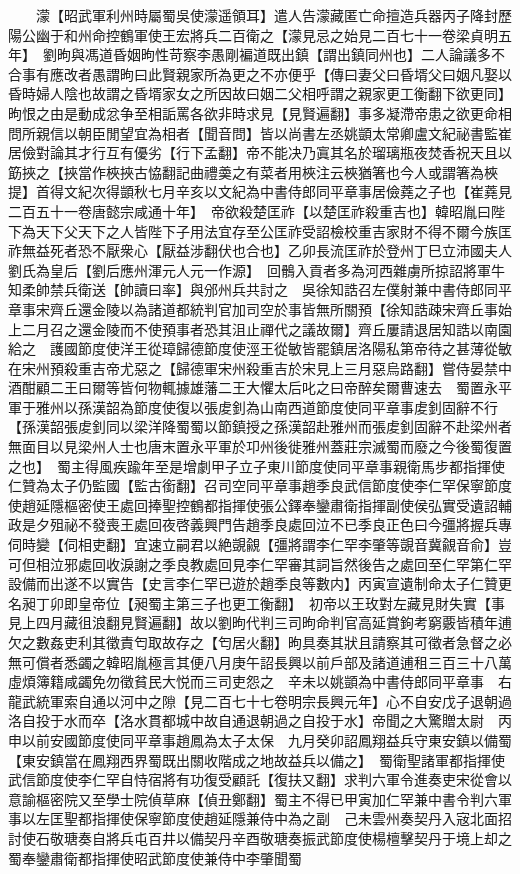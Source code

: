　　濛【昭武軍利州時屬蜀吳使濛遥領耳】遣人告濛藏匿亡命擅造兵器丙子降封歷陽公幽于和州命控鶴軍使王宏將兵二百衛之【濛見忌之始見二百七十一卷梁貞明五年】　劉昫與馮道昏姻昫性苛察李愚剛褊道既出鎮【謂出鎮同州也】二人論議多不合事有應改者愚謂昫曰此賢親家所為更之不亦便乎【傳曰妻父曰昏壻父曰姻凡娶以昏時婦人陰也故謂之昏壻家女之所因故曰姻二父相呼謂之親家更工衡翻下欲更同】昫恨之由是動成忿争至相詬罵各欲非時求見【見賢遍翻】事多凝滯帝患之欲更命相問所親信以朝臣閒望宜為相者【聞音問】皆以尚書左丞姚顗太常卿盧文紀祕書監崔居儉對論其才行互有優劣【行下孟翻】帝不能决乃寘其名於瑠璃瓶夜焚香祝天且以筯挾之【挾當作梜挾古恊翻記曲禮羮之有菜者用梜注云梜猶箸也今人或謂箸為梜提】首得文紀次得顗秋七月辛亥以文紀為中書侍郎同平章事居儉蕘之子也【崔蕘見二百五十一卷唐懿宗咸通十年】　帝欲殺楚匡祚【以楚匡祚殺重吉也】韓昭胤曰陛下為天下父天下之人皆陛下子用法宜存至公匡祚受詔檢校重吉家財不得不爾今族匡祚無益死者恐不厭衆心【厭益涉翻伏也合也】乙卯長流匡祚於登州丁巳立沛國夫人劉氏為皇后【劉后應州渾元人元一作源】　回鶻入貢者多為河西雜虜所掠詔將軍牛知柔帥禁兵衛送【帥讀曰率】與邠州兵共討之　吳徐知誥召左僕射兼中書侍郎同平章事宋齊丘還金陵以為諸道都統判官加司空於事皆無所關預【徐知誥疎宋齊丘事始上二月召之還金陵而不使預事者恐其沮止禪代之議故爾】齊丘屢請退居知誥以南園給之　護國節度使洋王從璋歸德節度使涇王從敏皆罷鎮居洛陽私第帝待之甚薄從敏在宋州預殺重吉帝尤惡之【歸德軍宋州殺重吉於宋見上三月惡烏路翻】嘗侍晏禁中酒酣顧二王曰爾等皆何物輒據雄藩二王大懼太后叱之曰帝醉矣爾曹速去　蜀置永平軍于雅州以孫漢韶為節度使復以張䖍釗為山南西道節度使同平章事䖍釗固辭不行【孫漢韶張䖍釗同以梁洋降蜀蜀以節鎮授之孫漢韶赴雅州而張䖍釗固辭不赴梁州者無面目以見梁州人士也唐末置永平軍於卭州後徙雅州蓋莊宗滅蜀而廢之今後蜀復置之也】　蜀主得風疾踰年至是增劇甲子立子東川節度使同平章事親衛馬步都指揮使仁贊為太子仍監國【監古銜翻】召司空同平章事趙季良武信節度使李仁罕保寧節度使趙延隱樞密使王處回捧聖控鶴都指揮使張公鐸奉鑾肅衛指揮副使侯弘實受遺詔輔政是夕殂祕不發喪王處回夜啓義興門告趙季良處回泣不已季良正色曰今彊將握兵專伺時變【伺相吏翻】宜速立嗣君以絶覬覦【彊將謂李仁罕李肇等覬音冀覦音俞】豈可但相泣邪處回收淚謝之季良教處回見李仁罕審其詞旨然後告之處回至仁罕第仁罕設備而出遂不以實告【史言李仁罕已遊於趙季良等數内】丙寅宣遺制命太子仁贊更名昶丁卯即皇帝位【昶蜀主第三子也更工衡翻】　初帝以王玫對左藏見財失實【事見上四月藏徂浪翻見賢遍翻】故以劉昫代判三司昫命判官高延賞鉤考窮覈皆積年逋欠之數姦吏利其徵責匄取故存之【匄居火翻】昫具奏其狀且請察其可徵者急督之必無可償者悉蠲之韓昭胤極言其便八月庚午詔長興以前戶部及諸道逋租三百三十八萬虛煩簿籍咸蠲免勿徵貧民大悦而三司吏怨之　辛未以姚顗為中書侍郎同平章事　右龍武統軍索自通以河中之隙【見二百七十七卷明宗長興元年】心不自安戊子退朝過洛自投于水而卒【洛水貫都城中故自通退朝過之自投于水】帝聞之大驚贈太尉　丙申以前安國節度使同平章事趙鳳為太子太保　九月癸卯詔鳳翔益兵守東安鎮以備蜀【東安鎮當在鳳翔西界蜀既出關收階成之地故益兵以備之】　蜀衛聖諸軍都指揮使武信節度使李仁罕自恃宿將有功復受顧託【復扶又翻】求判六軍令進奏吏宋從會以意諭樞密院又至學士院偵草麻【偵丑鄭翻】蜀主不得已甲寅加仁罕兼中書令判六軍事以左匡聖都指揮使保寧節度使趙延隱兼侍中為之副　己未雲州奏契丹入宼北面招討使石敬瑭奏自將兵屯百井以備契丹辛酉敬瑭奏振武節度使楊檀擊契丹于境上却之蜀奉鑾肅衛都指揮使昭武節度使兼侍中李肇聞蜀

